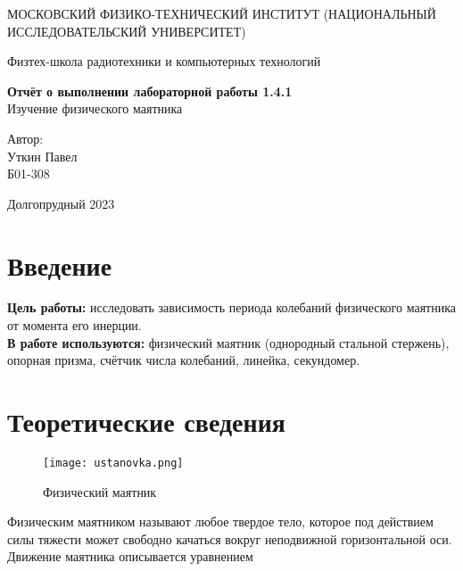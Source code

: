 \documentclass[a4paper,12pt]{article} %
\date{\today}
\begin{document}
\begin{titlepage}
	\begin{center}
		{\large МОСКОВСКИЙ ФИЗИКО-ТЕХНИЧЕСКИЙ ИНСТИТУТ (НАЦИОНАЛЬНЫЙ ИССЛЕДОВАТЕЛЬСКИЙ УНИВЕРСИТЕТ)}
	\end{center}
	\begin{center}
		{\large Физтех-школа радиотехники и компьютерных технологий}
	\end{center}
	
	
	\vspace{4.5cm}
	{\huge
		\begin{center}
			{\bf Отчёт о выполнении лабораторной работы 1.4.1}\\
			Изучение физического маятника
		\end{center}
	}
	\vspace{2cm}
	\begin{flushright}
		{\LARGE Автор:\\ Уткин Павел \\
			\vspace{0.2cm}
			Б01-308}
	\end{flushright}
	\vspace{8cm}
	\begin{center}
		Долгопрудный 2023
	\end{center}
\end{titlepage}

\section{Введение}

\textbf{Цель работы:} исследовать зависимость периода колебаний физического маятника от момента его инерции.\\
\textbf{В работе используются:} физический маятник (однородный стальной стержень), опорная призма, счётчик числа колебаний, линейка, секундомер.

\section{Теоретические сведения}

\begin{wrapfigure}{l}{6cm}
	\texttt{[image: ustanovka.png]}
	\caption{Физический маятник}\label{risunok}
\end{wrapfigure}

Физическим маятником называют любое твердое тело, которое под действием силы тяжести может свободно качаться вокруг неподвижной горизонтальной оси. Движение маятника ­описывается уравнением
\end{document}
